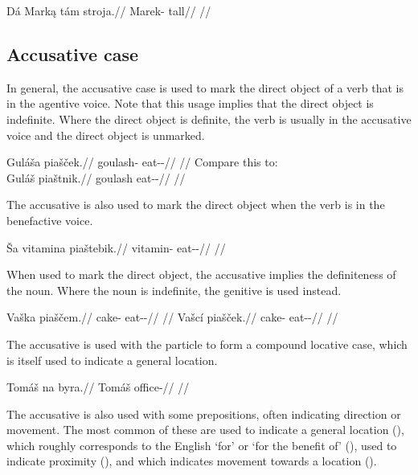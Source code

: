 \pex
\begingl
\gla Dá Marką tám stroja.//
\glb \First{}\Sg{} Marek-\Agt{} \Comp{} tall//
\glft {}//
\endgl
\xe

\subsection{Accusative case}\label{sec:accusative-case}

In general, the accusative case is used to mark the direct object of a verb that
is in the agentive voice. Note that this usage implies that the direct object is
indefinite. Where the direct object is definite, the verb is usually in the
accusative voice and the direct object is unmarked.

\pex
\a \begingl
\gla Guláša piašček.//
\glb goulash-\Acc{} eat-\Av{}-\Pf{}//
\glft {}//
\endgl
\a Compare this to:\\
\begingl
\gla Guláš piaštnik.//
\glb goulash eat-\Pv{}-\Pf{}//
\glft {}//
\endgl
\xe

The accusative is also used to mark the direct object when the verb is in the
benefactive voice.

\pex
\begingl
\gla Ša vitamina piaštebik.//
\glb {} vitamin-\Acc{} eat-\Ben{}-\Pf{}//
\glft {}//
\endgl
\xe


When used to mark the direct object, the accusative implies the definiteness of
the noun. Where the noun is indefinite, the genitive is used instead.

\pex
\a\begingl
\gla Vaška piaščem.//
\glb cake-\Acc{} eat-\Av{}-\Pf{}//
\glft {}//
\endgl
\a\begingl
\gla Vašcí piašček.//
\glb cake-\Gen{} eat-\Av{}-\Pf{}//
\glft {}//
\endgl
\xe

The accusative is used with the particle  to form a compound locative
case, which is itself used to indicate a general location.

\pex
\begingl
\gla Tomáš na byra.//
\glb Tomáš \Loc{} office-\Acc{}//
\glft {}//
\endgl
\xe

The accusative is also used with some prepositions, often indicating direction
or movement. The most common of these are  used to indicate a general
location (),  which roughly corresponds to
the English `for' or `for the benefit of' (), 
used to indicate proximity (), and 
which indicates movement towards a location ().

